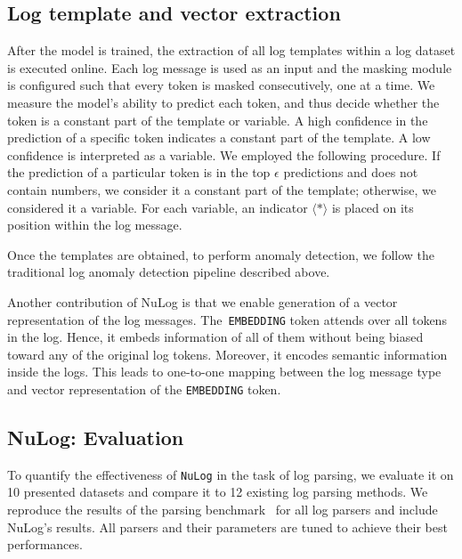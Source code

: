 \newpage

\subsection{Log template and vector extraction}
After the model is trained, the extraction of all log templates within a log dataset is executed online. Each log message is used as an input and the masking module is configured such that every token is masked consecutively, one at a time. We measure the model's ability to predict each token, and thus decide whether the token is a constant part of the template or variable. A high confidence in the prediction of a specific token indicates a constant part of the template. A low confidence is interpreted as a variable. We employed the following procedure. If the prediction of a particular token is in the top $\epsilon$ predictions and does not contain numbers, we consider it a constant part of the template; otherwise, we considered it a variable. For each variable, an indicator \texttt{$\langle * \rangle$} is placed on its position within the log message.

Once the templates are obtained, to perform anomaly detection, we follow the traditional log anomaly detection pipeline described above.


Another contribution of NuLog is that we enable generation of a vector representation of the log messages. The~\texttt{EMBEDDING} token attends over all tokens in the log. Hence, it embeds information of all of them without being biased toward any of the original log tokens. Moreover, it encodes semantic information inside the logs. This leads to one-to-one mapping between the log message type and vector representation of the \texttt{EMBEDDING} token. 

\subsection{NuLog: Evaluation}\label{nulog:evaluation}
To quantify the effectiveness of \texttt{NuLog} in the task of log parsing, we evaluate it on 10 presented datasets and compare it to 12 existing log parsing methods. We reproduce the results of the parsing benchmark~\cite{zhu2019tools} for all log parsers and include NuLog's results. All parsers and their parameters are tuned to achieve their best performances.

